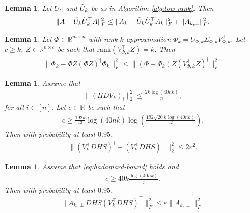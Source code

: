 \documentclass[13pt]{article}
\newtheorem{lem}[thm]{Lemma}
\theoremstyle{plain}
\newcommand{\R}{\mathbb{R}}
\newcommand{\N}{\mathbb{N}}
\newcommand{\rank}{\mathrm{rank}}
\newcommand{\til}{\ensuremath{\tilde}}
\begin{document}
\begin{lem}
    Let $U_C$ and $\til{U}_k$ be as in Algorithm \ref{alg:low-rank}.
    Then
    \[
        \begin{aligned}
            \|A - \til{U}_k\til{U}_k^\top A\|_F^2 \le \|A_k - \til{U}_k\til{U}_k^\top A_k\|_F^2 + \|A_{k, \perp}\|_F^2.
        \end{aligned}
    \]
\end{lem}

\begin{lem}
    Let $\Phi \in \R^{m \times n}$ with rank-$k$ approximation $\Phi_{k} = U_{\Phi, k} \Sigma_{\Phi, k} V^{\top}_{\Phi, k}$.
    Let $c \ge k$, $Z \in \R^{n \times c}$ be such that $\rank(V^\top_{\Phi, k}  Z) = k$.
    Then
    \[
        \begin{aligned}
            \|\Phi_{k} - \Phi Z (\Phi Z)^\dagger\Phi_k\|_F^2 \le \|(\Phi - \Phi_k)Z(V^\top_{\Phi, k}Z)^\dagger\|_F^2.
        \end{aligned}
    \]
\end{lem}

\begin{lem}
    Assume that
    \begin{align*} \label{eq:hadamard-bound}
        \|(HDV_k)_i\|_2^2 \le \frac{2k\log(40nk)}{n}, \tag{$\ast$}
    \end{align*}
    for all $i \in [n]$.
    Let $c \in \N$ be such that
    \[
        \begin{aligned}
            c \ge \frac{192k}{\varepsilon^2} \log(40nk)\log\left( \frac{192\sqrt{20} k \log(40nk)}{\varepsilon^2} \right).
        \end{aligned}
    \]
    Then with probability at least $0.95$,
    \[
        \begin{aligned}
            \|(V_k^\top DHS)^\dagger - (V_k^\top DHS)^\top\|_2^2 \le 2 \varepsilon^2.
        \end{aligned}
    \]
\end{lem}

\begin{lem}
    Assume that \eqref{eq:hadamard-bound} holds and
    \[
        \begin{aligned}
            c \ge 40k \frac{\log(40nk)}{\varepsilon}.
        \end{aligned}
    \]
    Then with probability at least $0.95$,
    \[
        \begin{aligned}
            \|A_{k, \perp}DHS (V_k^\top DHS)^\top\|_F^2 \le \varepsilon \|A_{k, \perp}\|_F^2.
        \end{aligned}
    \]
\end{lem}
\end{document}
